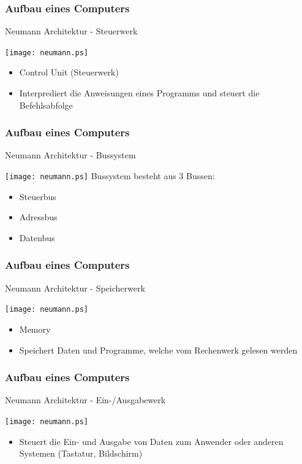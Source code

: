 \documentclass{beamer}
\begin{document}
\frame
{
	\frametitle{Aufbau eines Computers}
	Neumann Architektur - Steuerwerk\\
	\vspace{3mm}
	\begin{multicols}{2}
	\texttt{[image: neumann.ps]}
	\begin{itemize}
	\item Control Unit (Steuerwerk)
	\item Interprediert die Anweisungen eines Programms und steuert die Befehlsabfolge
	\end{itemize}
	\end{multicols}
}

\frame
{
	\frametitle{Aufbau eines Computers}
	Neumann Architektur - Bussystem\\
	\vspace{3mm}
	\begin{multicols}{2}
	\texttt{[image: neumann.ps]}
	Bussystem besteht aus 3 Bussen:
	\begin{itemize}
	\item Steuerbus
	\item Adressbus
	\item Datenbus
	\end{itemize}
	\end{multicols}
}

\frame
{
	\frametitle{Aufbau eines Computers}
	Neumann Architektur - Speicherwerk\\
	\vspace{3mm}
	\begin{multicols}{2}
	\texttt{[image: neumann.ps]}
	\begin{itemize}
	\item Memory
	\item Speichert Daten und Programme, welche vom Rechenwerk gelesen werden
	\end{itemize}
	\end{multicols}
}

\frame
{
	\frametitle{Aufbau eines Computers}
	Neumann Architektur - Ein-/Ausgabewerk\\
	\vspace{3mm}
	\begin{multicols}{2}
	\texttt{[image: neumann.ps]}
	\begin{itemize}
	\item Steuert die Ein- und Ausgabe von Daten zum Anwender oder anderen Systemen (Tastatur, Bildschirm)
	\end{itemize}
	\end{multicols}
}
\end{document}
